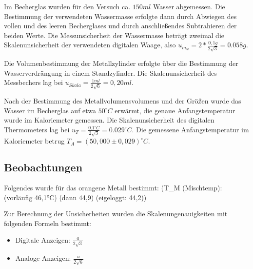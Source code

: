 \documentclass[class=article, crop=false]{standalone}
\begin{document}
Im Becherglas wurden für den Versuch ca. \(150ml\) Wasser abgemessen.
Die Bestimmung der verwendeten Wassermasse erfolgte dann durch Abwiegen
des vollen und des leeren Becherglases und durch anschließendes
Subtrahieren der beiden Werte. Die Messunsicherheit der Wassermasse
beträgt zweimal die Skalenunsicherheit der verwendeten digitalen Waage,
also \(u_{m_w}=2*\frac{0,1g}{2\sqrt{3}}=0.058g\).

Die Volumenbestimmung der Metallzylinder erfolgte über die Bestimmung
der Wasserverdrängung in einem Standzylinder. Die Skalenunsicherheit des
Messbechers lag bei \(u_{Skala}=\frac{1ml}{2\sqrt{6}}=0,20ml\).

Nach der Bestimmung des Metallvolumensvolumens und der Größen wurde das
Wasser im Becherglas auf etwa \(50^\circ C\) erwärmt, die genaue
Anfangstemperatur wurde im Kaloriemeter gemessen. Die Skalenunsicherheit
des digitalen Thermometers lag bei
\(u_T = \frac{0.1^\circ C}{2\sqrt{3}} = 0.029^\circ C\). Die gemessene
Anfangstemperatur im Kaloriemeter betrug
\(T_A=(50,000\pm 0,029)^\circ C\).

\hypertarget{beobachtungen-1}{%
\subsection{Beobachtungen}\label{beobachtungen-1}}

Folgendes wurde für das orangene Metall bestimmt: (T\_M (Mischtemp):
(vorläufig 46,1°C) (dann 44,9) (eigeloggt: 44,2))

Zur Berechnung der Unsicherheiten wurden die Skalenungenauigkeiten mit
folgenden Formeln bestimmt:

\begin{itemize}
  \item Digitale Anzeigen: $\frac{a}{2\sqrt{3}}$
  \item Analoge Anzeigen: $\frac{a}{2\sqrt{6}}$
\end{itemize}
\end{document}

